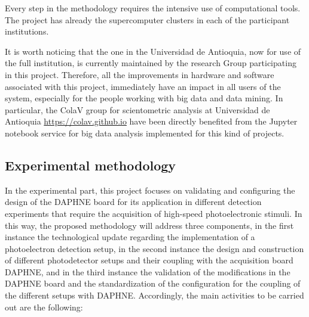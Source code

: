 \documentclass[a4paper,10pt,epsfig,epsf,amsfonts,amsmath]{article}
\begin{document}
Every step in the methodology requires the intensive use of computational tools.
The project has already the supercomputer clusters  in each of
the participant institutions.

It is worth noticing that the one in the Universidad de Antioquia, now for
use of the full institution,
is currently maintained by the research Group
participating in this project.  Therefore, all the improvements in
hardware and software associated with this project, immediately have
an impact in all users of the system, especially for the people working
with big data and data mining.  In particular, the ColaV group for
scientometric analysis at Universidad de Antioquia
\url{https://colav.github.io} have been directly benefited from the
Jupyter notebook service for big data analysis implemented for this
kind of projects.


\subsection{Experimental methodology}

In the experimental part, this project focuses on validating and configuring the design of the DAPHNE board for its application in different detection experiments that require the acquisition of high-speed photoelectronic stimuli. In this way, the proposed methodology will address three components, in the first instance the technological update regarding the implementation of a photoelectron detection setup, in the second instance the design and construction of different photodetector setups and their coupling with the acquisition board DAPHNE, and in the third instance the validation of the modifications in the DAPHNE board and the standardization of the configuration for the coupling of the different setups with DAPHNE. Accordingly, the main activities to be carried out are the following:
\end{document}
